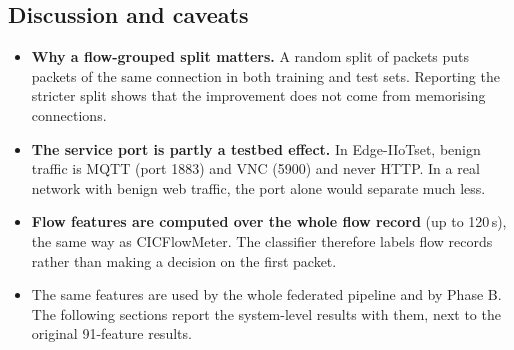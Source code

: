 \subsection{Discussion and caveats}
\begin{itemize}
  \item \textbf{Why a flow-grouped split matters.} A random split of packets puts packets of the same connection in both training and test sets. Reporting the stricter split shows that the improvement does not come from memorising connections.
  \item \textbf{The service port is partly a testbed effect.} In Edge-IIoTset, benign traffic is MQTT (port 1883) and VNC (5900) and never HTTP. In a real network with benign web traffic, the port alone would separate much less.
  \item \textbf{Flow features are computed over the whole flow record} (up to 120\,s), the same way as CICFlowMeter. The classifier therefore labels flow records rather than making a decision on the first packet.
  \item The same features are used by the whole federated pipeline and by Phase B. The following sections report the system-level results with them, next to the original 91-feature results.
\end{itemize}

